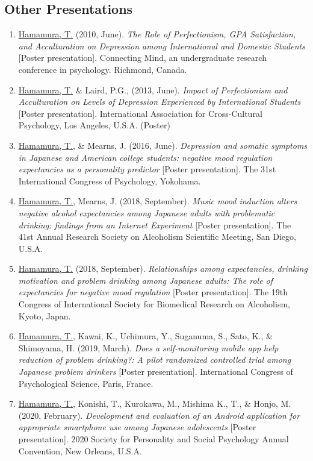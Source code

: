\documentclass[a4paper]{article}
\begin{document}
\subsection{Other Presentations}
\begin{enumerate}
	\item \underline{Hamamura, T.} (2010, June). \textit{The Role of Perfectionism, GPA Satisfaction, and Acculturation on Depression among International and Domestic Students} [Poster presentation]. Connecting Mind, an undergraduate research conference in psychology. Richmond, Canada.
	\item \underline{Hamamura, T.} \& Laird, P.G., (2013, June). \textit{Impact of Perfectionism and Acculturation on Levels of Depression Experienced by International Students} [Poster presentation]. International Association for Cross-Cultural Psychology, Los Angeles, U.S.A. (Poster)
	\item \underline{Hamamura, T.}, \& Mearns, J. (2016, June). \textit{Depression and somatic symptoms in Japanese and American college students: negative mood regulation expectancies as a personality predictor} [Poster presentation]. The 31st International Congress of Psychology, Yokohama.
	\item \underline{Hamamura, T.}, Mearns, J. (2018, September). \textit{Music mood induction alters negative alcohol expectancies among Japanese adults with problematic drinking: findings from an Internet Experiment} [Poster presentation]. The 41st Annual Research Society on Alcoholism Scientific Meeting, San Diego, U.S.A.
	\item \underline{Hamamura, T.} (2018, September). \textit{Relationships among expectancies, drinking motivation and problem drinking among Japanese adults: The role of expectancies for negative mood regulation} [Poster presentation]. The 19th Congress of International Society for Biomedical Research on Alcoholism, Kyoto, Japan.
	\item \underline{Hamamura, T.}, Kawai, K., Uchimura, Y., Suganuma, S., Sato, K., \& Shimoyama, H. (2019, March). \textit{Does a self-monitoring mobile app help reduction of problem drinking?: A pilot randomized controlled trial among Japanese problem drinkers} [Poster presentation]. International Congress of Psychological Science, Paris, France.
	\item \underline{Hamamura, T.}, Konishi, T., Kurokawa, M., Mishima K., T., \& Honjo, M. (2020, February). \textit{Development and evaluation of an Android application for appropriate smartphone use among Japanese adolescents} [Poster presentation]. 2020 Society for Personality and Social Psychology Annual Convention, New Orleans, U.S.A.

\end{enumerate}
\end{document}
